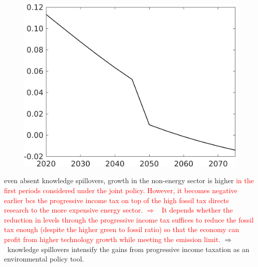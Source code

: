 \documentclass[12pt]{article}
\newcommand{\ar}{$\Rightarrow$ \ }
\newcommand{\tr}[1]{\textcolor{red}{#1}}
\begin{document}
\begin{figure}[h!!]
\begin{minipage}[]{0.32\textwidth}
	\end{minipage}		
	\begin{minipage}[]{0.32\textwidth}
		\includegraphics[width=1\textwidth]{../../codding_model/own_basedOnFried/optimalPol_010922_revision/figures/all_13Sept22/CompTaufPER_bytaul_Equlab_Reg0_EY_spillover0_nsk0_xgr0_knspil1_sep1_LFlimit1_emsbase0_countec0_GovRev0_etaa0.79_lgd0.png}
	\end{minipage}	
\end{figure}
even absent knowledge spillovers, growth in the non-energy sector is higher \tr{in the first periods considered under the joint policy. However, it becomes negative earlier bcs the progressive income tax on top of the high fossil tax directs research to the more expensive energy sector. \ar It depends whether the reduction in levels through the progressive income tax suffices to reduce the fossil tax enough (despite the higher green to fossil ratio) so that the economy can profit from higher technology growth while meeting the emission limit.}
\ar knowledge spillovers intensify the gains from progressive income taxation as an environmental policy tool. 
\end{document}
